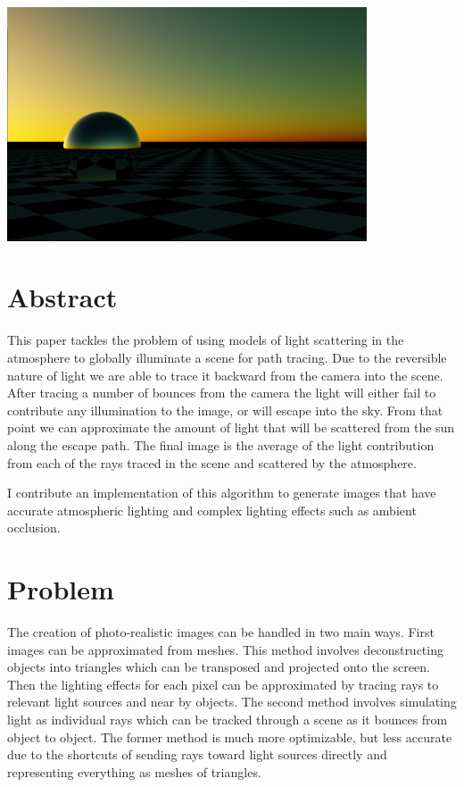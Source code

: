 \documentclass[12pt, letterpaper]{article}
\begin{document}
\singlespacing
\maketitle
\doublespacing

\begin{center}
  \includegraphics[width=0.8\textwidth]{SunsetSky}
\end{center}

\section{Abstract}

This paper tackles the problem of using models of light scattering in the
atmosphere to globally illuminate a scene for path tracing. Due to the reversible
nature of light we are able to trace it backward from the camera into the scene.
After tracing a number of bounces from the camera the light will either fail to
contribute any illumination to the image, or will escape into the sky. From that
point we can approximate the amount of light that will be scattered from the sun
along the escape path. The final image is the average of the light contribution
from each of the rays traced in the scene and scattered by the atmosphere.

I contribute an implementation of this algorithm to generate images that have
accurate atmospheric lighting and complex lighting effects such as ambient
occlusion.

\section{Problem}

The creation of photo-realistic images can be handled in two main ways. First
images can be approximated from meshes. This method involves deconstructing
objects into triangles which can be transposed and projected onto the screen.
Then the lighting effects for each pixel can be approximated by tracing rays to
relevant light sources and near by objects. The second method involves
simulating light as individual rays which can be tracked through a scene as it
bounces from object to object. The former method is much more optimizable, but
less accurate due to the shortcuts of sending rays toward light sources directly
and representing everything as meshes of triangles.
\end{document}
